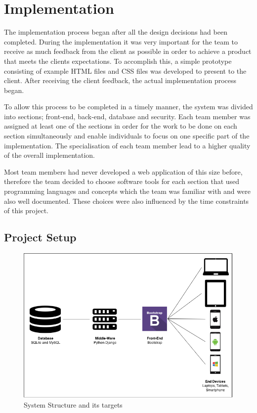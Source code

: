 \documentclass{l3proj}
\begin{document}
\chapter{Implementation}
\label{impl}
The implementation process began after all the design decisions had been completed. During the implementation it was very important for the team to receive as much feedback from the client as possible in order to achieve a product that meets the clients expectations. To accomplish this, a simple prototype consisting of example HTML files and CSS files was developed to present to the client. After receiving the client feedback, the actual implementation process began.

To allow this process to be completed in a timely manner, the system was divided into sections; front-end, back-end, database and security. Each team member was assigned  at least one of the sections in order for the work to be done on each section simultaneously and enable individuals to focus on one specific part of the implementation. The specialisation of each team member lead to a higher quality of the overall implementation.

Most team members had never developed a web application of this size before, therefore the team decided to choose software tools for each section that used programming languages and concepts which the team was familiar with and were also well documented. These choices were also influenced by the time constraints of this project.

\section{Project Setup}
{
\begin{figure}[h]
\caption{System Structure and its targets}
\centering
\includegraphics[scale=0.28]{SystemStructure.png}
\end{figure}
}
\end{document}
